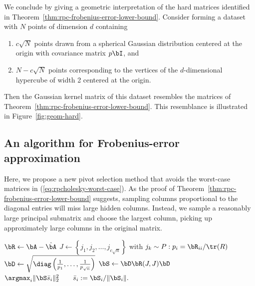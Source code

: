We conclude by giving a geometric interpretation of the hard matrices identified in Theorem~\ref{thm:rpc-frobenius-error-lower-bound}. Consider forming a dataset with $N$ points of dimension $d$ containing
\begin{enumerate}
    \item $c\sqrt{N}$ points drawn from a spherical Gaussian distribution centered at the origin with covariance matrix $p\bI$, and
    \item $N - c\sqrt{N}$ points corresponding to the vertices of the $d$-dimensional hypercube of width 2 centered at the origin.
\end{enumerate}
Then the Gaussian kernel matrix of this dataset resembles the matrices of Theorem~\ref{thm:rpc-frobenius-error-lower-bound}. This resemblance is illustrated in Figure~\ref{fig:geom-hard}.



\subsection{An algorithm for Frobenius-error approximation}
Here, we propose a new pivot selection method that avoids the worst-case matrices in (\ref{eq:rpcholesky-worst-case}). As the proof of Theorem~\ref{thm:rpc-frobenius-error-lower-bound} suggests, sampling columns proportional to the diagonal entries will miss large hidden columns. Instead, we sample a reasonably large principal submatrix and choose the largest column, picking up approximately large columns in the original matrix. 

\begin{algorithm}[ht]
\DontPrintSemicolon
    \label{alg:rpc2}
    \caption{}
    $\bR\gets \bA - \hat\bA$\;
    $J\gets \left\{j_1, j_2,\ldots, j_{c\sqrt{n}}\right\}$ with $j_k\sim P: p_i = \bR_{ii}/\tr(R)$\;
    $\bD\gets \sqrt{\diag\left(\frac{1}{{p_1}},\ldots, \frac{1}{{p_{\sqrt{n}}}}\right)}$\;
    $\bS\gets \bD\bR(J, J)\bD$\;
    \Return $\argmax_i \|\bS\bar s_i\|_2^2\qquad \bar s_i := \bS_i/\|\bS_i\|.$
\end{algorithm}




